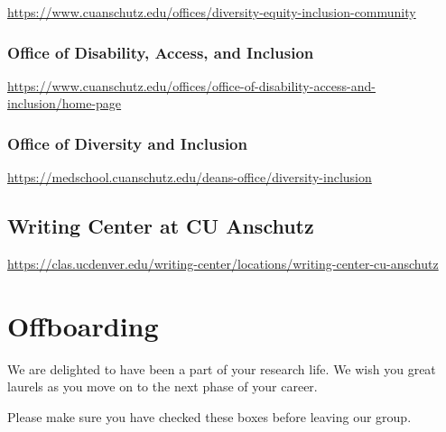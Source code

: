 \documentclass[
  letterpaper,
  DIV=11,
  numbers=noendperiod]{scrreprt}
\begin{document}
\url{https://www.cuanschutz.edu/offices/diversity-equity-inclusion-community}

\hypertarget{office-of-disability-access-and-inclusion}{%
\subsection{Office of Disability, Access, and
Inclusion}\label{office-of-disability-access-and-inclusion}}

\url{https://www.cuanschutz.edu/offices/office-of-disability-access-and-inclusion/home-page}

\hypertarget{office-of-diversity-and-inclusion}{%
\subsection{Office of Diversity and
Inclusion}\label{office-of-diversity-and-inclusion}}

\url{https://medschool.cuanschutz.edu/deans-office/diversity-inclusion}

\hypertarget{writing-center-at-cu-anschutz}{%
\section{Writing Center at CU
Anschutz}\label{writing-center-at-cu-anschutz}}

\url{https://clas.ucdenver.edu/writing-center/locations/writing-center-cu-anschutz}


\hypertarget{offboarding}{%
\chapter{Offboarding}\label{offboarding}}

We are delighted to have been a part of your research life. We wish you
great laurels as you move on to the next phase of your career.

Please make sure you have checked these boxes before leaving our group.
\end{document}
